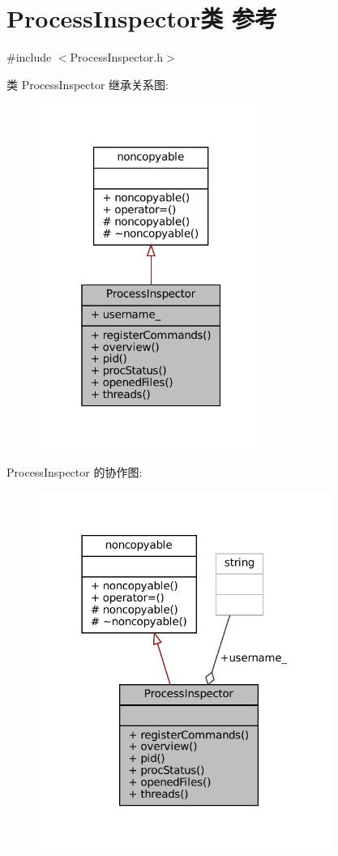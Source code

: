 \hypertarget{classmuduo_1_1net_1_1ProcessInspector}{}\section{Process\+Inspector类 参考}
\label{classmuduo_1_1net_1_1ProcessInspector}


{\ttfamily \#include $<$Process\+Inspector.\+h$>$}



类 Process\+Inspector 继承关系图\+:
\nopagebreak
\begin{figure}[H]
\begin{center}
\leavevmode
\includegraphics[width=208pt]{classmuduo_1_1net_1_1ProcessInspector__inherit__graph}
\end{center}
\end{figure}


Process\+Inspector 的协作图\+:
\nopagebreak
\begin{figure}[H]
\begin{center}
\leavevmode
\includegraphics[width=271pt]{classmuduo_1_1net_1_1ProcessInspector__coll__graph}
\end{center}
\end{figure}
